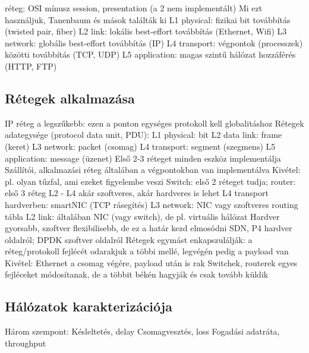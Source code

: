 \documentclass[12pt,a4paper]{article}
\begin{document}
\begin{outline}
	 réteg: OSI mínusz session, presentation (a 2 nem implementált)
	\1 Mi ezt használjuk, Tanenbaum és mások találták ki
	\1 L1 physical: fizikai bit továbbítás (twisted pair, fiber)
	\1 L2 link: lokális best-effort továbbítás (Ethernet, Wifi)
	\1 L3 network: globális best-effort továbbítás (IP)
	\1 L4 transport: végpontok (processzek) közötti továbbítás (TCP, UDP)
	\1 L5 application: magas szintű hálózat hozzáférés (HTTP, FTP)
\end{outline}

\pagebreak

\subsection{Rétegek alkalmazása}

\begin{outline}
	\1 IP réteg a legszűkebb: ezen a ponton egységes protokoll kell globalitáshoz
	\1 Rétegek adategysége (protocol data unit, PDU):
		\2 L1 physical: bit
		\2 L2 data link: frame (keret)
		\2 L3 network: packet (csomag)
		\2 L4 transport: segment (szegmens)
		\2 L5 application: message (üzenet)
	\1 Első 2-3 réteget minden eszköz implementálja
		\2 Szállítói, alkalmazási réteg általában a végpontokban van implementálva
		\2 Kivétel: pl. olyan tűzfal, ami ezeket figyelembe veszi
		\2 Switch: első 2 réteget tudja; router: első 3 réteg
	\1 L2 - L4 akár szoftveres, akár hardveres is lehet
		\2 L4 transport hardverben: smartNIC (TCP rásegítés)
		\2 L3 network: NIC vagy szoftveres routing tábla
		\2 L2 link: általában NIC (vagy switch), de pl. virtuális hálózat
		\2 Hardver gyorsabb, szoftver flexibilisebb, de ez a határ kezd elmosódni
			\3 SDN, P4 hardver oldalról; DPDK szoftver oldalról
	\1 Rétegek egymást enkapszulálják: a réteg/protokoll fejlécét odarakjuk a többi mellé, legvégén pedig a payload van
		\2 Kivétel: Ethernet a csomag végére, payload után is rak
		\2 Switchek, routerek egyes fejléceket módosítanak, de a többit békén hagyják és csak tovább küldik
\end{outline}

\pagebreak

\subsection{Hálózatok karakterizációja}

\begin{outline}
	\1 Három szempont:
		\2 Késleltetés, delay
		\2 Csomagvesztés, loss
		\2 Fogadási adatráta, throughput
\end{outline}
\end{document}
